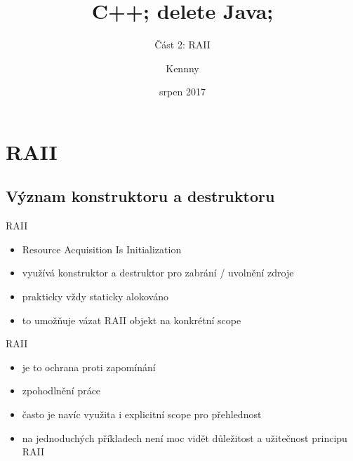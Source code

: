 \documentclass{beamer}
\begin{document}
\title{C++; delete Java;}
\subtitle{Část 2: RAII}
\author{Kennny}
\date{srpen 2017}

\frame{\titlepage}


\newenvironment{xframe}[1][]
  {\begin{frame}[fragile,environment=xframe,#1]}
  {\end{frame}}

\begin{comment}
\begin{xframe}{tttt}
	\begin{itemize}
		\item
	\end{itemize}
\end{xframe}
\end{comment}



\section{RAII}
\subsection{Význam konstruktoru a destruktoru}



\begin{xframe}{RAII}
	\begin{itemize}
		\item Resource Acquisition Is Initialization
		\item využívá konstruktor a destruktor pro zabrání / uvolnění zdroje
		\item prakticky vždy staticky alokováno
		\item to umožňuje vázat RAII objekt na konkrétní scope
	\end{itemize}
\end{xframe}

\begin{xframe}{RAII}
	\begin{itemize}
		\item je to ochrana proti zapomínání
		\item zpohodlnění práce
		\item často je navíc využita i explicitní scope pro přehlednost
		\item na jednoduchých příkladech není moc vidět důležitost a užitečnost principu RAII
	\end{itemize}
\end{xframe}
\end{document}
